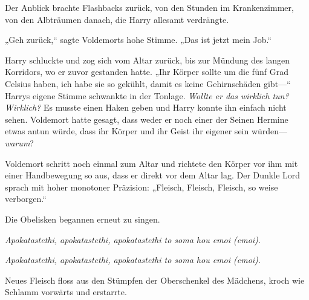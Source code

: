 Der Anblick brachte Flashbacks zurück, von den Stunden im Krankenzimmer, von den Albträumen danach, die Harry allesamt verdrängte.

„Geh zurück,“ sagte Voldemorts hohe Stimme. „Das ist jetzt mein Job.“

Harry schluckte und zog sich vom Altar zurück, bis zur Mündung des langen Korridors, wo er zuvor gestanden hatte.
„Ihr Körper sollte um die fünf Grad Celsius haben, ich habe sie so gekühlt, damit es keine Gehirnschäden gibt—“ Harrys eigene Stimme schwankte in der Tonlage.
\emph{Wollte er das wirklich tun? Wirklich?}
Es musste einen Haken geben und Harry konnte ihn einfach nicht sehen. Voldemort hatte gesagt, dass weder er noch einer der Seinen Hermine etwas antun würde, dass ihr Körper und ihr Geist ihr eigener sein würden—\emph{warum}?

Voldemort schritt noch einmal zum Altar und richtete den Körper vor ihm mit einer Handbewegung so aus, dass er direkt vor dem Altar lag. Der Dunkle Lord sprach mit hoher monotoner Präzision:
„Fleisch, Fleisch, Fleisch, so weise verborgen.“

Die Obelisken begannen erneut zu singen.

\emph{Apokatastethi, apokatastethi, apokatastethi to soma hou emoi (emoi).}

\emph{Apokatastethi, apokatastethi, apokatastethi to soma hou emoi (emoi).}

Neues Fleisch floss aus den Stümpfen der Oberschenkel des Mädchens, kroch wie Schlamm vorwärts und erstarrte.

